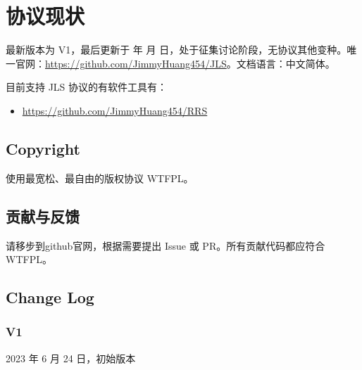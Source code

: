 \renewcommand{\today}{\number\year 年 \number\month 月 \number\day 日}

\chapter{协议现状}

最新版本为 V1，最后更新于 \today，处于征集讨论阶段，无协议其他变种。唯一官网：\href{https://github.com/JimmyHuang454/JLS}{https://github.com/JimmyHuang454/JLS}。文档语言：中文简体。

目前支持 JLS 协议的有软件工具有：
\begin{itemize}
	\item \href{https://github.com/JimmyHuang454/RRS}{https://github.com/JimmyHuang454/RRS}
\end{itemize}



\section{Copyright}
使用最宽松、最自由的版权协议 WTFPL。

\section{贡献与反馈}
请移步到github官网，根据需要提出 Issue 或 PR。所有贡献代码都应符合 WTFPL。

\section{Change Log}
\subsection{V1}
2023 年 6 月 24 日，初始版本
